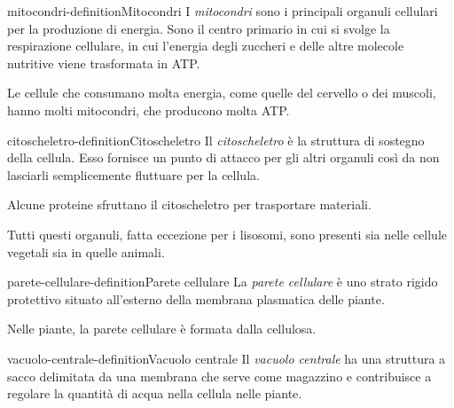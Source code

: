 \documentclass[preview]{standalone}
\begin{document}
\begin{snippetdefinition}{mitocondri-definition}{Mitocondri}
    I \textit{mitocondri} sono i principali organuli cellulari per la produzione di energia.
    Sono il centro primario in cui si svolge la respirazione cellulare, in cui l'energia degli
    zuccheri e delle altre
    molecole nutritive viene trasformata in ATP.
\end{snippetdefinition}

\begin{plainhtml}
    Le cellule che consumano molta energia, come
    quelle del cervello o dei muscoli, hanno molti mitocondri, che producono molta ATP.
\end{plainhtml}

\begin{snippetdefinition}{citoscheletro-definition}{Citoscheletro}
    Il \textit{citoscheletro} è la struttura di sostegno della cellula.
    Esso fornisce un punto di attacco per gli altri organuli così da non 
    lasciarli semplicemente fluttuare per la cellula.
\end{snippetdefinition}

\begin{plainhtml}
    Alcune proteine sfruttano il citoscheletro per trasportare materiali.
\end{plainhtml}

\begin{plainhtml}
    Tutti questi organuli, fatta eccezione per i lisosomi, sono presenti
    sia nelle cellule vegetali sia in quelle animali.
\end{plainhtml}

\begin{snippetdefinition}{parete-cellulare-definition}{Parete cellulare}
    La \textit{parete cellulare} è uno strato rigido protettivo situato all'esterno della membrana
    plasmatica delle piante.
\end{snippetdefinition}

\begin{plainhtml}
    Nelle piante, la parete cellulare è formata dalla cellulosa.
\end{plainhtml}

\begin{snippetdefinition}{vacuolo-centrale-definition}{Vacuolo centrale}
    Il \textit{vacuolo centrale} ha una struttura a sacco delimitata da una membrana che serve come
    magazzino e contribuisce a regolare la quantità di acqua nella cellula nelle piante.
\end{snippetdefinition}
\end{document}
